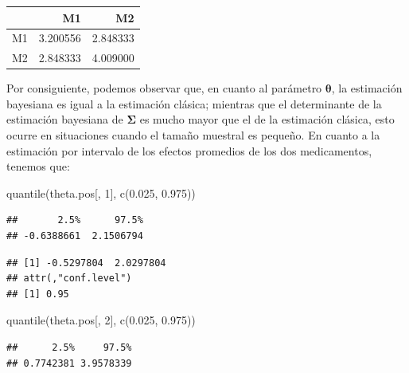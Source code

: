 \documentclass[
  10pt,
  spanish,
]{book}
\newenvironment{Shaded}{\begin{snugshade}}{\end{snugshade}}
\newcommand{\DecValTok}[1]{\textcolor[rgb]{0.00,0.00,0.81}{#1}}
\newcommand{\FloatTok}[1]{\textcolor[rgb]{0.00,0.00,0.81}{#1}}
\newcommand{\FunctionTok}[1]{\textcolor[rgb]{0.00,0.00,0.00}{#1}}
\newcommand{\NormalTok}[1]{#1}
\newcommand{\SpecialCharTok}[1]{\textcolor[rgb]{0.00,0.00,0.00}{#1}}
\theoremstyle{definition}
\theoremstyle{definition}
\theoremstyle{definition}
\theoremstyle{definition}
\theoremstyle{remark}
\begin{document}
\begin{tabular}{l|r|r}
\hline
  & M1 & M2\\
\hline
M1 & 3.200556 & 2.848333\\
\hline
M2 & 2.848333 & 4.009000\\
\hline
\end{tabular}

Por consiguiente, podemos observar que, en cuanto al parámetro \(\boldsymbol \theta\), la estimación bayesiana es igual a la estimación clásica; mientras que el determinante de la estimación bayesiana de \(\boldsymbol \Sigma\) es mucho mayor que el de la estimación clásica, esto ocurre en situaciones cuando el tamaño muestral es pequeño. En cuanto a la estimación por intervalo de los efectos promedios de los dos medicamentos, tenemos que:

\begin{Shaded}
\begin{Highlighting}[]
\FunctionTok{quantile}\NormalTok{(theta.pos[, }\DecValTok{1}\NormalTok{], }\FunctionTok{c}\NormalTok{(}\FloatTok{0.025}\NormalTok{, }\FloatTok{0.975}\NormalTok{))}
\end{Highlighting}
\end{Shaded}

\begin{verbatim}
##       2.5%      97.5% 
## -0.6388661  2.1506794
\end{verbatim}

\begin{Shaded}
\end{Shaded}

\begin{verbatim}
## [1] -0.5297804  2.0297804
## attr(,"conf.level")
## [1] 0.95
\end{verbatim}

\begin{Shaded}
\begin{Highlighting}[]
\FunctionTok{quantile}\NormalTok{(theta.pos[, }\DecValTok{2}\NormalTok{], }\FunctionTok{c}\NormalTok{(}\FloatTok{0.025}\NormalTok{, }\FloatTok{0.975}\NormalTok{))}
\end{Highlighting}
\end{Shaded}

\begin{verbatim}
##      2.5%     97.5% 
## 0.7742381 3.9578339
\end{verbatim}
\end{document}
